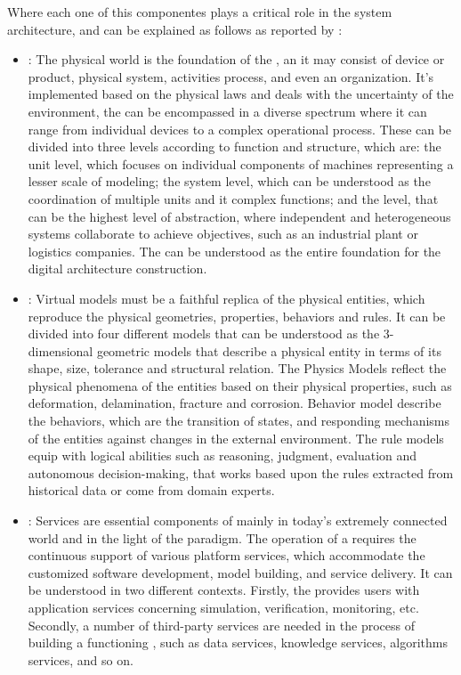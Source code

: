 Where each one of this componentes plays a critical role in the system architecture, and can be explained as follows as 
reported by :

\begin{itemize}
    \item \PE: The physical world is the foundation of the \DT, an it may consist of device or product, physical system, activities process, and even an organization. It's implemented based on the physical laws and deals with the uncertainty of the environment, the \PE can be encompassed in a diverse spectrum where it can range from individual devices to a complex operational process. These \PEs can be divided into three levels according to function and structure, which are: the unit level, which focuses on individual components of machines representing a lesser scale of modeling; the system level, which can be understood as the coordination of multiple units and it complex functions; and the \SoS level, that can be the highest level of abstraction, where independent and heterogeneous systems collaborate to achieve objectives, such as an industrial plant or logistics companies. The \PEs can be understood as the entire foundation for the digital architecture construction.
    \item \VM: Virtual models must be a faithful replica of the physical entities, which reproduce the physical geometries, properties, behaviors and rules. It can be divided into four different models that can be understood as the 3-dimensional geometric models that describe a physical entity in terms of its shape, size, tolerance and structural relation. The Physics Models reflect the physical phenomena of the entities based on their physical properties, such as deformation, delamination, fracture and corrosion. Behavior model describe the behaviors, which are the transition of states, and responding mechanisms of the entities against changes in the external environment. The rule models equip \DTs with logical abilities such as reasoning, judgment, evaluation and autonomous decision-making, that works based upon the rules extracted from historical data or come from domain experts.
    \item \Ss: Services are essential components of \DTs mainly in today's extremely connected world and in the light of the \XaaS paradigm. The operation of a \DT requires the continuous support of various platform services, which accommodate the customized software development, model building, and service delivery. It can be understood in two different contexts. Firstly, the \DT provides users with application services concerning simulation, verification, monitoring, etc. Secondly, a number of third-party services are needed in the process of building a functioning \DT, such as data services, knowledge services, algorithms services, and so on.

\end{itemize}
